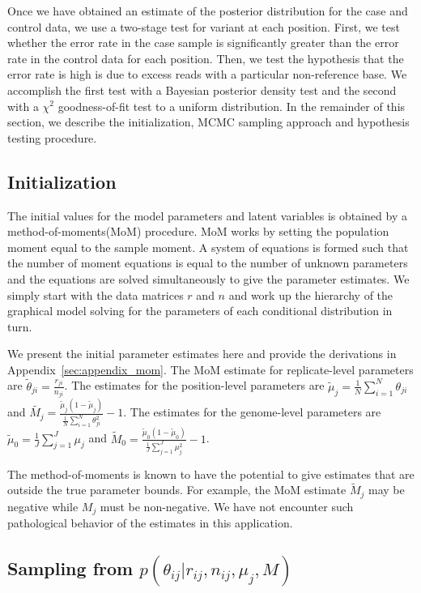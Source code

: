 \documentclass[11pt,reqno]{amsart}
\begin{document}
Once we have obtained an estimate of the posterior distribution for the case and control data, we use a two-stage test for variant at each position. First, we test whether the error rate in the case sample is significantly greater than the error rate in the control data for each position. Then, we test the hypothesis that the error rate is high is due to excess reads with a particular non-reference base. We accomplish the first test with a Bayesian posterior density test and the second with a $\chi^2$ goodness-of-fit test to a uniform distribution. In the remainder of this section, we describe the initialization, MCMC sampling approach and hypothesis testing procedure.

\subsection{Initialization}
The initial values for the model parameters and latent variables is obtained by a method-of-moments(MoM) procedure. MoM works by setting the population moment equal to the sample moment. A system of equations is formed such that the number of moment equations is equal to the number of unknown parameters and the equations are solved simultaneously to give the parameter estimates. We simply start with the data matrices $r$ and $n$ and work up the hierarchy of the graphical model solving for the parameters of each conditional distribution in turn.

We present the initial parameter estimates here and provide the derivations in Appendix~\ref{sec:appendix_mom}. The MoM estimate for replicate-level parameters are $\tilde{\theta}_{ji} = \frac{r_{ji}} {n_{ji}}$. The estimates for the position-level parameters are $\tilde{\mu}_j = \frac{1}{N} \sum_{i=1}^N \theta_{ji}$ and $\tilde{M_j} = \frac{ \tilde{\mu}_j (1 - \tilde{\mu}_j ) } { \frac{1}{N} \sum_{i=1}^N \theta_{ji}^2 } -1$. The estimates for the genome-level parameters are $\tilde{\mu}_0 = \frac{1}{J} \sum_{j=1}^J \mu_j$ and $\tilde{M}_0 = \frac{ \tilde{\mu}_0 (1 - \tilde{\mu}_0 ) } {\frac{1}{J} \sum_{j=1}^J \mu_j^2 } -1$.

The method-of-moments is known to have the potential to give estimates that are outside the true parameter bounds. For example, the MoM estimate $\tilde{M}_j$ may be negative while $M_j$ must be non-negative. We have not encounter such pathological behavior of the estimates in this application. 

\subsection{Sampling from $p \left( \theta_{ij} |r_{ij},n_{ij},\mu_j,M \right)$}
\end{document}
